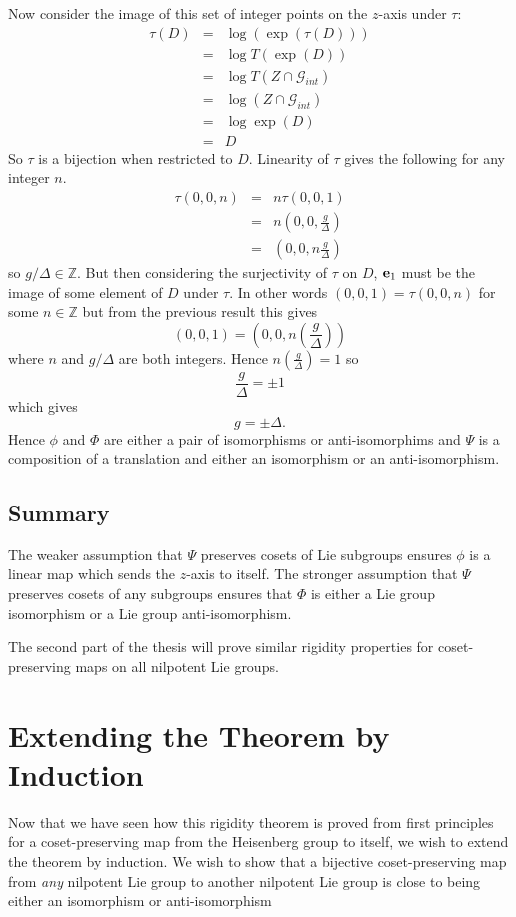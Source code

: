 \documentclass[honours]{UNSWthesis}
\newcommand{\Z}{\mathbb{Z}}
\newcommand{\G}{\mathcal{G}}
\newcommand{\1}{\mathbf{e}_{1}}
\newcommand{\2}{\mathbf{e}_{3}}
\newcommand{\3}{\mathbf{e}_{3}}
\begin{document}
Now consider the image of this set of integer points on the $z$-axis under $\tau$:
\begin{eqnarray*}
\tau(D)&=& \log(\exp (\tau(D))) \\
&=& \log T(\exp (D)) \\
&=& \log T(Z \cap \G_{int}) \\
&=& \log (Z \cap \G_{int}) \\
&=& \log \exp (D) \\
&=& D
\end{eqnarray*}
So $\tau$ is a bijection when restricted to $D$. Linearity of $\tau$ gives the following for any integer $n$.
\begin{eqnarray*}
\tau (0,0,n) &=& n \tau (0,0,1) \\
&=& n\left(0,0, \frac{g}{\Delta}\right) \\
&=& \left(0,0, n \frac{g}{\Delta}\right)
\end{eqnarray*}
so $g/\Delta \in \Z$. But then considering the surjectivity of $\tau$ on $D$, ${\bf e}_{1}$ must be the image of some element of $D$ under $\tau$. In other words $(0,0,1)=\tau(0,0,n)$ for some $n \in \Z$ but from the previous result this gives 
\[
(0,0,1)=\left(0,0, n\left(\frac{g}{\Delta}\right)\right)
\]
where $n$ and $g/\Delta$ are both integers. Hence $n \left( \frac{g}{\Delta}\right)=1$ so 
\[
\frac{g}{\Delta}= \pm 1
\]
which gives
\[
g=\pm \Delta.
\]
Hence $\phi$ and $\Phi$ are either a pair of isomorphisms or anti-isomorphims and $\Psi$ is a composition of a translation and either an isomorphism or an anti-isomorphism.

\section{Summary}
The weaker assumption that $\Psi$ preserves cosets of Lie subgroups ensures $\phi$ is a linear map which sends the $z$-axis to itself. The stronger assumption that $\Psi$ preserves cosets of any subgroups ensures that $\Phi$ is either a Lie group isomorphism or a Lie group anti-isomorphism.


The second part of the thesis will prove similar rigidity properties for coset-preserving maps on all nilpotent Lie groups. 


\chapter{Extending the Theorem by Induction}

Now that we have seen how this rigidity theorem is proved from first principles for a coset-preserving map from the Heisenberg group to itself, we wish to extend the theorem by induction. We wish to show that a bijective coset-preserving map from \emph{any} nilpotent Lie group to another nilpotent Lie group is close to being either an isomorphism or anti-isomorphism 
\end{document}
